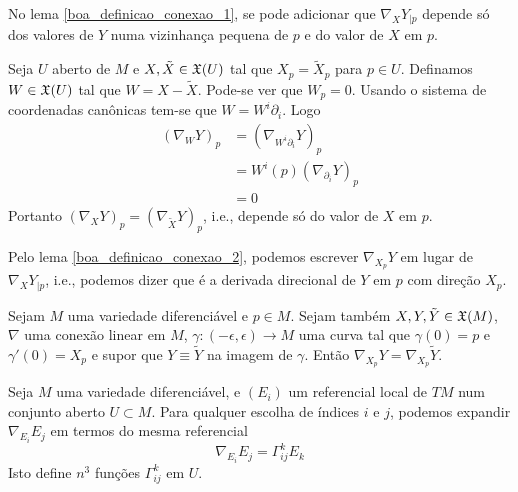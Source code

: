 \begin{proposicao}\label{boa_definicao_conexao_2}
	No lema \ref{boa_definicao_conexao_1}, se pode adicionar que $\nabla_X Y_{|p}$ depende só dos valores de $Y$ numa vizinhança pequena de $p$ e do valor de $X$ em $p$.
\end{proposicao}

\begin{demonstracao}
	Seja $U$ aberto de $M$ e $X, \tilde{X} \in \mathfrak{X}(U)$ tal que $X_p = \tilde{X}_p$ para $p \in U$. Definamos $W \in \mathfrak{X}(U)$ tal que $W = X - \tilde{X}$. Pode-se ver que $W_p = 0$. Usando o sistema de coordenadas canônicas tem-se que $W = W^i \partial_i$. Logo
	\begin{align*}
		(\nabla_W Y)_p &= (\nabla_{W^i \partial_i} Y)_p\\
		&=   W^i(p) (\nabla_{\partial_i} Y)_p\\
		&= 0
	\end{align*}
	Portanto $(\nabla_X Y)_p = (\nabla_{\tilde{X}} Y)_p$, i.e., depende só do valor de $X$ em $p$.
\end{demonstracao}

\begin{observacao}
	Pelo lema \ref{boa_definicao_conexao_2}, podemos escrever $\nabla_{X_p} Y$ em lugar de $\nabla_X Y_{|p}$, i.e., podemos dizer que é a derivada direcional de $Y$ em $p$ com direção $X_p$.
\end{observacao}

\begin{lema}\label{conexao-linear-numa-curva}
	Sejam $M$ uma variedade diferenciável e $p \in M$. Sejam também $X, Y, \tilde{Y} \in \mathfrak{X}(M)$, $\nabla$ uma conexão linear em $M$, $\gamma: (-\epsilon, \epsilon) \rightarrow M$ uma curva tal que $\gamma(0)=p$ e  $\gamma'(0) = X_p$ e supor que $Y \equiv \tilde{Y}$ na imagem de $\gamma$. Então $\nabla_{X_p} Y = \nabla_{X_p} \tilde{Y}$.
\end{lema}

\begin{observacao}\label{obs_simbolos_christoffel}
	Seja $M$ uma variedade diferenciável, e $(E_i)$ um referencial local de $TM$ num conjunto aberto $U \subset M$. Para qualquer escolha de índices $i$ e $j$, podemos expandir $\nabla_{E_i} E_j$ em termos do mesma referencial
	\begin{equation*}
		\nabla_{E_i} E_j = \Gamma^k_{ij} E_k
	\end{equation*}
	Isto define $n^3$ funções $\Gamma^k_{ij}$ em $U$.
\end{observacao}

